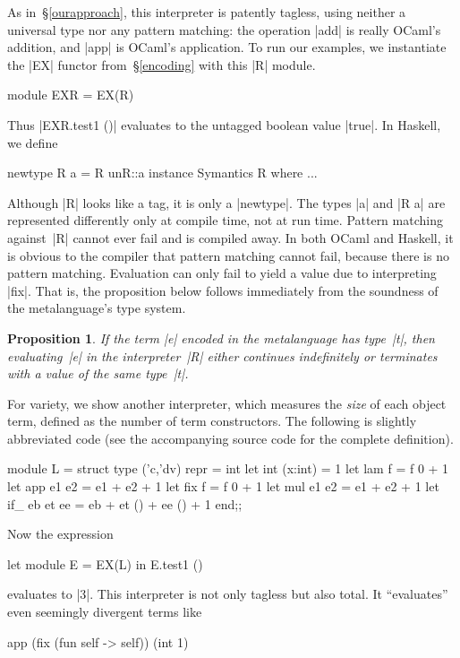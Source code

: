 \documentclass[preprint]{sigplanconf}
\newtheorem{prop}{Proposition}
\begin{document}
As in~\S\ref{ourapproach},
this interpreter is patently tagless, using neither a universal type nor
any pattern matching: the operation |add| is really
OCaml's addition, and |app| is OCaml's application. To run our
examples, we instantiate the |EX| functor from~\S\ref{encoding} with this |R|
module.
\begin{code}
module EXR = EX(R)
\end{code}
Thus |EXR.test1 ()| evaluates to the untagged boolean value |true|.
In Haskell, we define
\begin{code}
newtype R a = R {unR::a}
instance Symantics R where ...
\end{code}
Although |R| looks like a tag, it is only
a |newtype|.  The types |a| and |R a| are represented differently
only at compile time, not at run time.  Pattern matching against~|R|
cannot ever fail and is compiled away.
In both OCaml and Haskell, it is obvious to the compiler that
pattern matching cannot fail, because there is no
pattern matching. Evaluation can only fail to yield a value
due to interpreting |fix|.
That is, the proposition below follows immediately from the soundness of
the metalanguage's type system.
\begin{prop}
If the term |e| encoded in the metalanguage has type~|t|,
then evaluating~|e| in the interpreter~|R| either continues
indefinitely or terminates with a value of the same type~|t|.
\end{prop}

For variety, we show another interpreter, which measures the \emph{size}
of each object term, defined as the number of term
constructors. The following is slightly abbreviated code (see the
accompanying source code for the complete definition).
\begin{code}
module L = struct
  type ('c,'dv) repr = int
  let int (x:int)  = 1
  let lam f        = f 0 + 1
  let app e1 e2    = e1 + e2 + 1
  let fix f        = f 0 + 1
  let mul e1 e2    = e1 + e2 + 1
  let if_ eb et ee = eb + et () + ee () + 1
end;;
\end{code}
Now the expression
\begin{code}
let module E = EX(L) in E.test1 ()
\end{code}
evaluates to |3|. This interpreter is not only tagless but also
total. It ``evaluates'' even seemingly divergent terms like
\begin{code}
app (fix (fun self -> self)) (int 1)
\end{code}

\begin{comment}
module EX1(S: Symantics) = struct
 open S
 let tfix () = app (fix (fun self -> self)) (int 1)
end;;
let module E =EX1(R) in E.tfix ();;
let module E =EX1(L) in E.tfix ();;
\end{comment}
\end{document}
